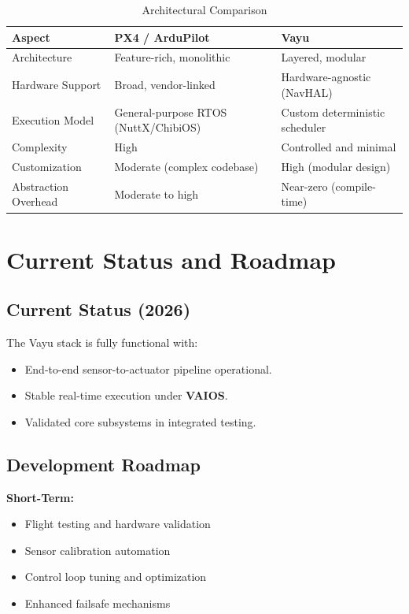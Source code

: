 \documentclass[11pt]{article}
\newcommand{\vaios}{\textbf{VAIOS}}
\begin{document}
\begin{table}[H]
\centering
\caption{Architectural Comparison}
\begin{tabular}{p{2.5cm}p{3.5cm}p{3.5cm}}
\toprule
\textbf{Aspect} & \textbf{PX4 / ArduPilot} & \textbf{Vayu} \\
\midrule
Architecture & Feature-rich, monolithic & Layered, modular \\
Hardware Support & Broad, vendor-linked & Hardware-agnostic (NavHAL) \\
Execution Model & General-purpose RTOS (NuttX/ChibiOS) & Custom deterministic scheduler \\
Complexity & High & Controlled and minimal \\
Customization & Moderate (complex codebase) & High (modular design) \\
Abstraction Overhead & Moderate to high & Near-zero (compile-time) \\
\bottomrule
\end{tabular}
\end{table}

\section{Current Status and Roadmap}

\subsection{Current Status (2026)}

The Vayu stack is fully functional with:
\begin{itemize}[leftmargin=*]
    \item End-to-end sensor-to-actuator pipeline operational.
    \item Stable real-time execution under \vaios.
    \item Validated core subsystems in integrated testing.
\end{itemize}

\subsection{Development Roadmap}

\textbf{Short-Term:}
\begin{itemize}[leftmargin=*]
    \item Flight testing and hardware validation
    \item Sensor calibration automation
    \item Control loop tuning and optimization
    \item Enhanced failsafe mechanisms
\end{itemize}
\end{document}
